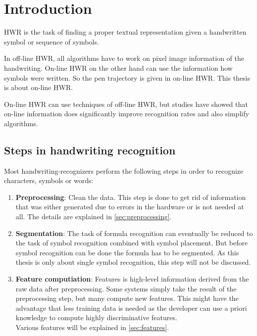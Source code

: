 \chapter{Introduction}\label{ch:Introduction}

\Gls{HWR} is the task of finding a proper textual representation
given a handwritten symbol or sequence of symbols.

In off-line \gls{HWR}, all algorithms have to work on pixel image
information of the handwriting. On-line \gls{HWR} on the other
hand can use the information how symbols were written. So the pen trajectory
is given in on-line \gls{HWR}.
This thesis is about on-line \gls{HWR}.

On-line \gls{HWR} can use techniques of off-line \gls{HWR}, but studies have
showed that on-line information does significantly improve recognition rates
and also simplify algorithms\cite{Guyon91,Becker72}.

\section{Steps in handwriting recognition}
Most handwriting-recognizers perform the following steps in order to recognize
characters, symbols or words:

\begin{enumerate}
    \item \textbf{Preprocessing}: Clean the data. This step is done to get rid
          of information that was either generated due to errors in the hardware %
          or is not needed at all. The details are explained in
          \cref{sec:preprocessing}.
    \item \textbf{Segmentation}: The task of formula recognition can eventually
          be reduced to the task of symbol recognition combined with symbol
          placement. But before symbol recognition can be done the formula has
          to be segmented. As this thesis %
          is only about single symbol recognition, this step will not be discussed.
    \item \textbf{Feature computiation}: Features is high-level information derived
          from the raw data after preprocessing. Some systems simply take the
          result of the preprocessing step, but many compute new features. This
          might have the advantage that less training data is needed as the
          developer can use a priori knowledge to compute highly discriminative
          features.\\
          Various features will be explained in \cref{sec:features}.
\end{enumerate}

